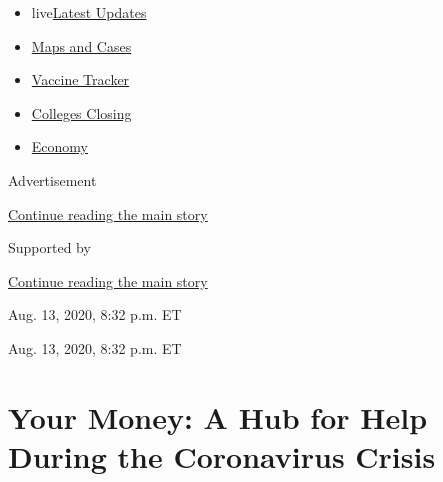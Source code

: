 \begin{itemize}
\tightlist
\item
  live\href{https://www.nytimes3xbfgragh.onion/2020/08/21/world/covid-19-coronavirus.html?name=styln-coronavirus\&region=TOP_BANNER\&variant=undefined\&block=storyline_menu_recirc\&action=click\&pgtype=Article\&impression_id=6d6bc091-e392-11ea-bdca-c743cc6a6463}{Latest
  Updates}
\item
  \href{https://www.nytimes3xbfgragh.onion/interactive/2020/us/coronavirus-us-cases.html?name=styln-coronavirus\&region=TOP_BANNER\&variant=undefined\&block=storyline_menu_recirc\&action=click\&pgtype=Article\&impression_id=6d6be7a0-e392-11ea-bdca-c743cc6a6463}{Maps
  and Cases}
\item
  \href{https://www.nytimes3xbfgragh.onion/interactive/2020/science/coronavirus-vaccine-tracker.html?name=styln-coronavirus\&region=TOP_BANNER\&variant=undefined\&block=storyline_menu_recirc\&action=click\&pgtype=Article\&impression_id=6d6be7a1-e392-11ea-bdca-c743cc6a6463}{Vaccine
  Tracker}
\item
  \href{https://www.nytimes3xbfgragh.onion/2020/08/19/us/colleges-closing-covid.html?name=styln-coronavirus\&region=TOP_BANNER\&variant=undefined\&block=storyline_menu_recirc\&action=click\&pgtype=Article\&impression_id=6d6be7a2-e392-11ea-bdca-c743cc6a6463}{Colleges
  Closing}
\item
  \href{https://www.nytimes3xbfgragh.onion/live/2020/08/20/business/stock-market-today-coronavirus?name=styln-coronavirus\&region=TOP_BANNER\&variant=undefined\&block=storyline_menu_recirc\&action=click\&pgtype=Article\&impression_id=6d6be7a3-e392-11ea-bdca-c743cc6a6463}{Economy}
\end{itemize}

Advertisement

\protect\hyperlink{after-top}{Continue reading the main story}

Supported by

\protect\hyperlink{after-sponsor}{Continue reading the main story}

Aug. 13, 2020, 8:32 p.m. ET

Aug. 13, 2020, 8:32 p.m. ET

\hypertarget{your-money-a-hub-for-help-during-the-coronavirus-crisis}{%
\section{Your Money: A Hub for Help During the Coronavirus
Crisis}\label{your-money-a-hub-for-help-during-the-coronavirus-crisis}}

